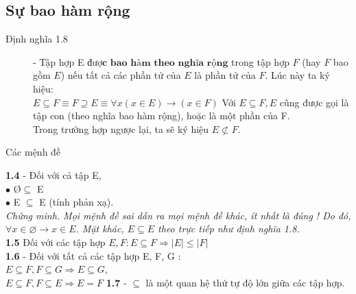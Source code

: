 \documentclass[11pt,a4paper]{report}
\begin{document}
\subsection{Sự bao hàm rộng}
\begin{description}
	\item[Định nghĩa 1.8] - Tập hợp E $\textbf{được bao hàm theo nghĩa rộng}$ trong tập hợp $F$ (hay $F$ bao gồm $E$) nếu tất cả các phần tử của $E$ là phần tử của $F$. Lúc này ta ký hiệu:\\
	$E \subseteq F \equiv F \supseteq E \equiv \forall x (x\in E) \rightarrow (x \in F)$
	Với $E \subseteq F, E$ cũng được gọi là tập con (theo nghĩa bao hàm rộng), hoặc là một phần của F.\\
	Trong trường hợp ngược lại, ta sẽ ký hiệu $E \not\subset F$.
\end{description}
	\begin{description}
		\item[Các mệnh đề]
	\end{description}
\textbf{1.4} - Đối với cả tập E,\\
$\bullet$ \O $\subseteq$ E\\
$\bullet$ E $\subseteq$ E (tính phản xạ).\\
\textit{Chứng minh. Mọi mệnh đề sai dẫn ra mọi mệnh đề khác, ít nhất là đúng ! Do đó, $\forall x \in \varnothing \rightarrow x \in E$. Mặt khác, $E \subseteq E $ theo trực tiếp như định nghĩa 1.8.}\\
\textbf{1.5} Đối với các tập hợp $E, F : E \subseteq F \Rightarrow |E| \leq |F|$\\
\textbf{1.6} - Đối với tất cả các tập hợp E, F, G :\\
$E \subseteq F, F \subseteq G \Rightarrow E \subseteq G,$\\
$E \subseteq F, F \subseteq E \Rightarrow E = F$
\textbf{1.7} - $\subseteq$ là một quan hệ thứ tự độ lớn giữa các tập hợp.
\end{document}
